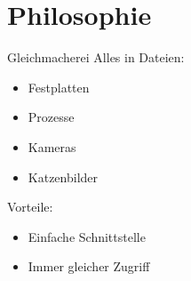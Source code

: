 \section[alles Datei]{Philosophie}
\begin{frame}{Gleichmacherei}
Alles in Dateien:
\begin{itemize}
 \item Festplatten
 \item Prozesse
 \item Kameras
 \item Katzenbilder
\end{itemize}

Vorteile:
\begin{itemize}
 \item Einfache Schnittstelle
 \item Immer gleicher Zugriff 
\end{itemize}

\end{frame}

